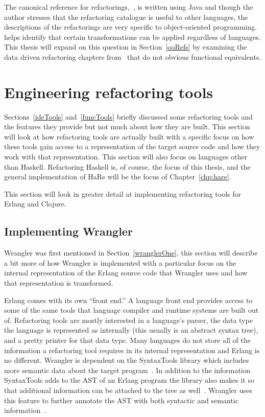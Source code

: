 The canonical reference for refactorings,~\cite{fowler}, is written using Java and though the author stresses that the refactoring catalogue is useful to other languages, the descriptions of the refactorings are very specific to object-oriented programming.~\cite{genericRefactoring} helps identify that certain transformations can be applied regardless of languages. This thesis will expand on this question in Section~\ref{ooRefs} by examining the data driven refactoring chapters from~\cite{fowler} that do not obvious functional equivalents.

\section{Engineering refactoring tools}\label{engineeringRefac}

Sections~\ref{ideTools} and~\ref{funcTools} briefly discussed some refactoring tools and the features they provide but not much about how they are built. This section will look at how refactoring tools are actually built with a specific focus on how these tools gain access to a representation of the target source code and how they work with that representation. This section will also focus on languages other than Haskell. Refactoring Haskell is, of course, the focus of this thesis, and the general implementation of HaRe will be the focus of Chapter~\ref{chp:hare}.

This section will look in greater detail at implementing refactoring tools for Erlang and Clojure.

\subsection{Implementing Wrangler}

Wrangler was first mentioned in Section~\ref{wranglerOne}, this section will describe a bit more of how Wrangler is implemented with a particular focus on the internal representation of the Erlang source code that Wrangler uses and how that representation is transformed. 

Erlang comes with its own ``front end.'' A language front end provides access to some of the same tools that language compiler and runtime systems are built out of. Refactoring tools are mostly interested in a language's parser, the data type the language is represented as internally (this usually is an abstract syntax tree), and a pretty printer for that data type. Many languages do not store all of the information a refactoring tool requires in its internal representation and Erlang is no different. Wrangler is dependent on the SyntaxTools library which includes more semantic data about the target program~\citep{wranglerUpdated}. In addition to the information SyntaxTools adds to the AST of an Erlang program the library also makes it so that additional information can be attached to the tree as well~\citep{syntaxTools}. Wrangler uses this feature to further annotate the AST with both syntactic and semantic information~\citep{wranglerUpdated}.  

